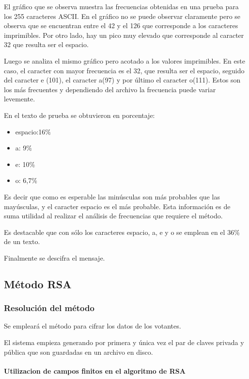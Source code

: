 \documentclass[a4paper,10pt]{article}
\begin{document}
El gráfico que se observa muestra las frecuencias obtenidas en una prueba para los 255 caracteres ASCII. En el gráfico no se puede observar claramente pero se observa que se encuentran entre el 42 y el 126 que corresponde a los caracteres imprimibles. Por otro lado, hay un pico muy elevado que corresponde al caracter 32 que resulta ser el espacio.

Luego se analiza el mismo gráfico pero acotado a los valores imprimibles. En este caso, el caracter con mayor frecuencia es el 32, que resulta ser el espacio, seguido del caracter e (101), el caracter a(97) y por último el caracter o(111). Estos son los más frecuentes y dependiendo del archivo la frecuencia puede variar levemente.

En el texto de prueba se obtuvieron en porcentaje:
\begin{itemize}
\item espacio:16\%
\item a: 9\%
\item e: 10\%
\item o: 6,7\%
\end{itemize}

Es decir que como es esperable las minúsculas son más probables que las mayúsculas, y el caracter espacio es el más probable. Esta información es de suma utilidad al realizar el análisis de frecuencias que requiere el método.

Es destacable que con sólo los caracteres espacio, a, e y o se emplean en el 36\% de un texto.

Finalmente se descifra el mensaje.

\subsection{Método RSA}

\subsubsection{Resolución del método}

Se empleará el método para cifrar los datos de los votantes.

El sistema empieza generando por primera y única vez el par de claves privada y pública que son guardadas en un archivo en disco.

\paragraph{Utilizacion de campos finitos en el algoritmo de RSA}
\end{document}
